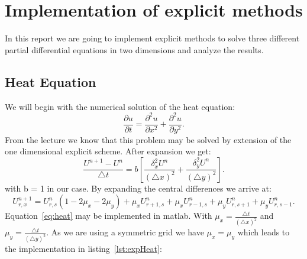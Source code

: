 


\maketitle

\section{Implementation of explicit methods}
In this report we are going to implement explicit methods to solve three different partial differential equations in two dimensions and analyze the results.
\subsection{Heat Equation}
We will begin with the numerical solution of the heat equation:
\begin{equation}
\frac{\partial u}{\partial t} = \frac{\partial^2 u}{\partial x^2} + \frac{\partial^2 u}{\partial y^2}.
\end{equation}
From the lecture we know that this problem may be solved by extension of the one dimensional explicit scheme. After expansion we get:
\begin{equation}
\frac{U^{n+1}-U^{n}}{\triangle t} = b [\frac{\delta_x^2 U^n}{(\triangle x)^2} + \frac{\delta_y^2 U^n}{(\triangle y)^2} ].
\end{equation}
with b = 1 in our case. By expanding the central differences we arrive at:
\begin{equation}
U_{r,x}^{n+1} = U_{r,s}^n (1 - 2\mu_x - 2\mu_y) + \mu_x U_{r+1,s}^n + \mu_x U_{r-1,s}^n + \mu_y U_{r,s+1}^n + \mu_y U_{r,s-1}^n.
\label{eq:heat}
\end{equation}
Equation~\ref{eq:heat} may be implemented in matlab. With $\mu_x = \frac{\triangle t}{(\triangle x)^2}$ and $\mu_y = \frac{\triangle t}{(\triangle y)^2}$. As we are using a symmetric grid we have $\mu_x = \mu_y$ which leads to the implementation in listing~\ref{lst:expHeat}: 


